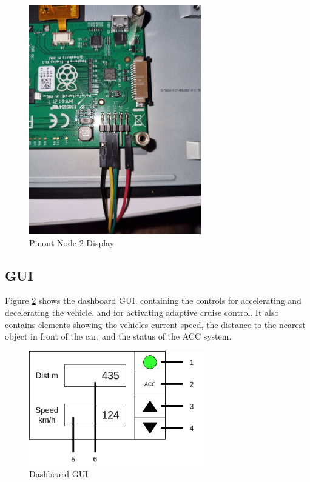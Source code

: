 \begin{figure}[h]
	\includegraphics[height=100mm]{images/node2-display.jpg}
	\centering
	\caption{Pinout Node 2 Display}
	\label{fig:node2-display}
\end{figure}

\clearpage
\subsection{GUI}

Figure \ref{fig:gui} shows the dashboard GUI, containing the controls for accelerating and decelerating the vehicle, and for activating adaptive cruise control. It also contains elements showing the vehicles current speed, the distance to the nearest object in front of the car, and the status of the ACC system.

\begin{figure}[h]
	\includegraphics[height=50mm]{images/GUI.png}
	\centering
	\caption{Dashboard GUI}
	\label{fig:gui}
\end{figure}

